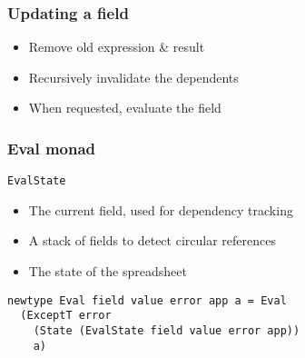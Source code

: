 \documentclass{beamer}
\begin{document}
\begin{frame}
\frametitle{Updating a field}
\begin{itemize}
	\item Remove old expression \& result
	\item Recursively invalidate the dependents
	\item When requested, evaluate the field
\end{itemize}
\end{frame}

\begin{frame}[fragile]
\frametitle{Eval monad}

\texttt{EvalState}
\begin{itemize}
	\item The current field, used for dependency tracking
	\item A stack of fields to detect circular references
	\item The state of the spreadsheet
\end{itemize}

\begin{verbatim}
newtype Eval field value error app a = Eval
  (ExceptT error
    (State (EvalState field value error app))
    a)
\end{verbatim}
\end{frame}

\frame{\titlepage}
\end{document}

